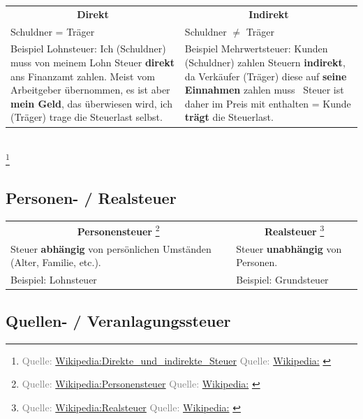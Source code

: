 \documentclass{beamer}
\let\oldfootnote\footnote
\renewcommand{\footnote}[1]
{%
	\oldfootnote
	{
		\tiny
		\textcolor{gray}{#1}
	}%
}
\newcommand{\citewiki}[2][]
{%
	\footnote
	{
		\ifthenelse{\isempty{#1}}
		{
			Quelle: \href{https://de.wikipedia.org/wiki/#2}{Wikipedia:#2}
		}
		{
			Quelle: \href{https://de.wikipedia.org/wiki/#2}{Wikipedia:#1}
		}
	}
}
\begin{document}
			\begin{frame}
				\begin{tabularx}{\linewidth}{X|X}
					\multicolumn{1}{c|}{\textbf{Direkt}} &
					\multicolumn{1}{c}{\textbf{Indirekt}} \\[0.25cm]
					Schuldner = Träger & Schuldner $\neq$ Träger \\
					\vspace{0.25cm}Beispiel Lohnsteuer: \newline
						Ich (Schuldner) muss von meinem Lohn Steuer \textbf{direkt} ans Finanzamt zahlen. Meist vom Arbeitgeber übernommen, es ist aber \textbf{mein Geld}, das überwiesen wird, ich (Träger) trage die Steuerlast selbst. & 
					\vspace{0.25cm}Beispiel Mehrwertsteuer: \newline
						Kunden (Schuldner) zahlen Steuern \textbf{indirekt}, da Verkäufer (Träger) diese auf \textbf{seine Einnahmen} zahlen muss \textrightarrow\ Steuer ist daher im Preis mit enthalten = Kunde \textbf{trägt} die Steuerlast.
				\end{tabularx}\\
				\citewiki{Direkte\_und\_indirekte\_Steuer}
			\end{frame}
		
		\subsection{Personen- / Realsteuer}
		
			\begin{frame}
				\begin{tabularx}{\linewidth}{X|X}
					\multicolumn{1}{c|}{\textbf{Personensteuer}\citewiki{Personensteuer}} &
					\multicolumn{1}{c}{\textbf{Realsteuer}\citewiki{Realsteuer}} \\[0.25cm]
					Steuer \textbf{abhängig} von persönlichen Umständen (Alter, Familie, etc.). & Steuer \textbf{unabhängig} von Personen. \\
					\vspace{0.25cm} Beispiel: Lohnsteuer &
					\vspace{0.25cm} Beispiel: Grundsteuer
				\end{tabularx}
			\end{frame}
		
		\subsection{Quellen- / Veranlagungssteuer}
		
\end{document}
